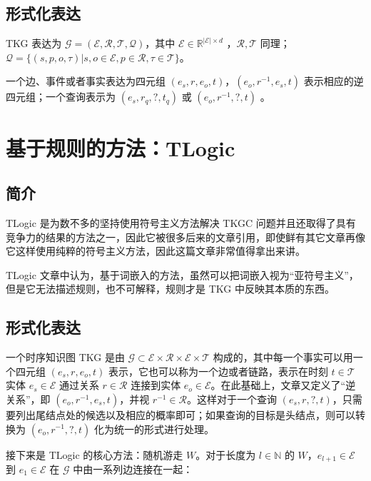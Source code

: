 \documentclass[a4paper, AutoFakeBold]{article}
\begin{document}
\subsection{形式化表达}

TKG 表达为 ${\mathcal G}=({\mathcal E},{\mathcal R},{\mathcal T},{\mathcal Q})$，其中 ${\mathcal E}\in{\mathbb R}^{|{\mathcal E}|\times d}$ ，${\mathcal R},{\mathcal T}$ 同理；${\mathcal Q}=\{(s,p,o,\tau)|s,o\in{\mathcal E},p\in{\mathcal R},\tau\in{\mathcal T}\}$。

一个边、事件或者事实表达为四元组 $(e_s,r,e_o,t)$，$(e_o,r^{-1},e_s,t)$ 表示相应的逆四元组；一个查询表示为 $(e_s,r_q,?,t_q)$ 或 $(e_o,r^{-1},?,t)$ 。


\section{基于规则的方法：TLogic}

\subsection{简介}

TLogic 是为数不多的坚持使用符号主义方法解决 TKGC 问题并且还取得了具有竞争力的结果的方法之一，因此它被很多后来的文章引用，即使鲜有其它文章再像它这样使用纯粹的符号主义方法，因此这篇文章非常值得拿出来讲。

TLogic 文章中认为，基于词嵌入的方法，虽然可以把词嵌入视为“亚符号主义”，但是它无法描述规则，也不可解释，规则才是 TKG 中反映其本质的东西。

\subsection{形式化表达}

一个时序知识图 TKG 是由 ${\mathcal G}\subset{\mathcal E}\times{\mathcal R}\times{\mathcal E}\times{\mathcal T}$ 构成的，其中每一个事实可以用一个四元组 $(e_s,r,e_o,t)$ 表示，它也可以称为一个边或者链路，表示在时刻 $t\in{\mathcal T}$ 实体 $e_s\in{\mathcal E}$ 通过关系 $r\in{\mathcal R}$ 连接到实体 $e_o\in{\mathcal E}$。在此基础上，文章又定义了“逆关系”，即 $(e_o,r^{-1},e_s,t)$，并视 $r^{-1}\in{\mathcal R}$。这样对于一个查询 $(e_s,r,?,t)$，只需要列出尾结点处的候选以及相应的概率即可；如果查询的目标是头结点，则可以转换为 $(e_o,r^{-1},?,t)$ 化为统一的形式进行处理。

接下来是 TLogic 的核心方法：随机游走 $W$。对于长度为 $l\in{\mathbb N}$ 的 $W$，$e_{l+1}\in{\mathcal E}$ 到 $e_1\in{\mathcal E}$ 在 ${\mathcal G}$ 中由一系列边连接在一起：
\end{document}
